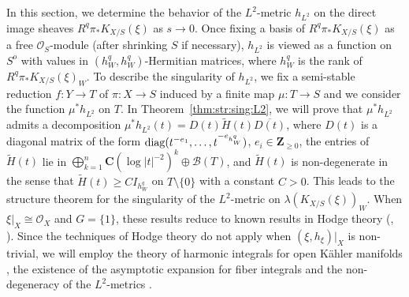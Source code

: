 \documentclass[amscd, leqno]{amsart}
\theoremstyle{plain}
\theoremstyle{definition}
\theoremstyle{remark}
\begin{document}
\medskip
In this section, we determine the behavior of the $L^{2}$-metric $h_{L^{2}}$ on the direct image sheaves $R^{q}\pi_{*}K_{X/S}(\xi)$
as $s \to 0$.
Once fixing a basis of $R^{q}\pi_{*}K_{X/S}(\xi)$ as a free ${\mathcal O}_{S}$-module (after shrinking $S$ if necessary), 
$h_{L^{2}}$ is viewed as a function on $S^{o}$ with values in $(h_{W}^{q}, h_{W}^{q})$-Hermitian matrices, 
where $h_{W}^{q}$ is the rank of $R^{q}\pi_{*}K_{X/S}(\xi)_{W}$. 
To describe the singularity of $h_{L^{2}}$, we fix a semi-stable reduction $f \colon Y \to T$
of $\pi \colon X \to S$ induced by a finite map $\mu \colon T \to S$ and we consider the function $\mu^{*}h_{L^{2}}$ on $T$.
In Theorem~\ref{thm:str:sing:L2}, we will prove that $\mu^{*}h_{L^{2}}$ admits a decomposition 
$\mu^{*}h_{L^{2}}(t) = D(t) \widetilde{H}(t) \overline{D(t)}$, where $D(t)$ is a diagonal matrix of the form 
${\rm diag}( t^{-e_{1}}, \ldots, t^{-e_{h_{W}^{q}}} )$, $e_{i} \in {\mathbf Z}_{\geq0}$, 
the entries of $\widetilde{H}(t)$ lie in $\bigoplus_{k=1}^{n} {\mathbf C} ( \log |t|^{-2} )^{k} \oplus {\mathcal B}(T)$, 
and $\widetilde{H}(t)$ is non-degenerate in the sense that $\widetilde{H}(t) \geq C I_{h_{W}^{q}}$ on $T\setminus\{0\}$ with a constant $C>0$.
This leads to the structure theorem for the singularity of the $L^{2}$-metric on $\lambda(K_{X/S}(\xi))_{W}$.
When $\xi|_{X} \cong {\mathcal O}_{X}$ and $G=\{1\}$, these results reduce to known results in Hodge theory (\cite{Schmid73}, \cite{EFM21}).  
Since the techniques of Hodge theory do not apply when $(\xi, h_{\xi})|_{X}$ is  non-trivial, 
we will employ the theory of harmonic integrals for open K\"ahler manifolds \cite{Takegoshi95}, 
the existence of the asymptotic expansion for fiber integrals \cite{Barlet82, Takayama21, Takayama22}
and the non-degeneracy of the $L^{2}$-metrics \cite{MourouganeTakayama09}.



\end{document}
